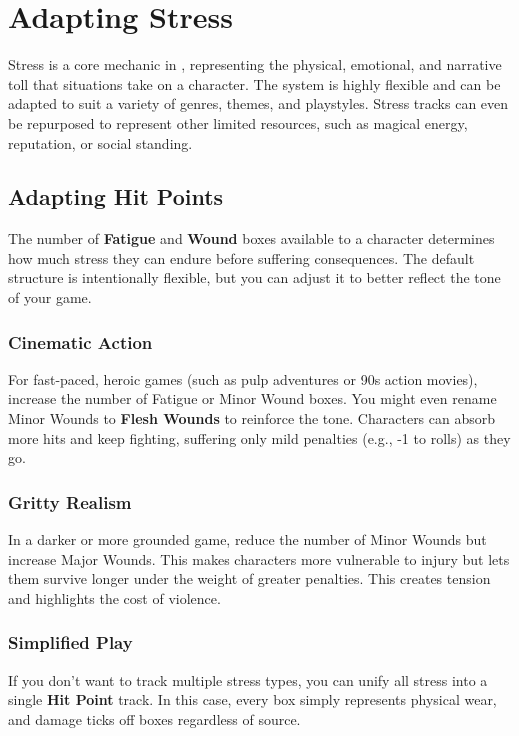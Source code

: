 \section{Adapting Stress}\label{toolbox:sec:adapting-stress}

Stress is a core mechanic in \wyrd, representing the physical, emotional, and narrative toll that situations take on a character. The system is highly flexible and can be adapted to suit a variety of genres, themes, and playstyles. Stress tracks can even be repurposed to represent other limited resources, such as magical energy, reputation, or social standing.

\subsection{Adapting Hit Points}

The number of \textbf{Fatigue} and \textbf{Wound} boxes available to a character determines how much stress they can endure before suffering consequences. The default structure is intentionally flexible, but you can adjust it to better reflect the tone of your game.

\subsubsection{Cinematic Action}
For fast-paced, heroic games (such as pulp adventures or 90s action movies), increase the number of Fatigue or Minor Wound boxes. You might even rename Minor Wounds to \textbf{Flesh Wounds} to reinforce the tone. Characters can absorb more hits and keep fighting, suffering only mild penalties (e.g., -1 to rolls) as they go.

\subsubsection{Gritty Realism}
In a darker or more grounded game, reduce the number of Minor Wounds but increase Major Wounds. This makes characters more vulnerable to injury but lets them survive longer under the weight of greater penalties. This creates tension and highlights the cost of violence.

\subsubsection{Simplified Play}
If you don’t want to track multiple stress types, you can unify all stress into a single \textbf{Hit Point} track. In this case, every box simply represents physical wear, and damage ticks off boxes regardless of source.

